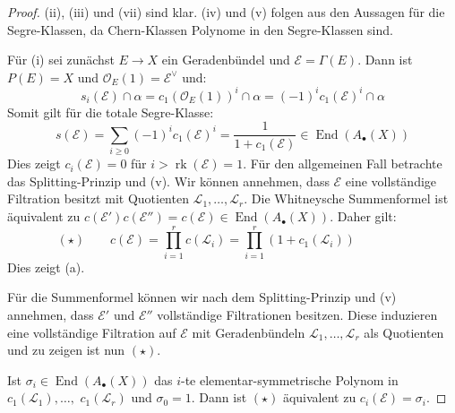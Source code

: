 \documentclass[10pt,a4paper]{article}
\begin{document}
\begin{proof}
(ii), (iii) und (vii) sind klar. (iv) und (v) folgen aus den Aussagen für die Segre-Klassen, da Chern-Klassen Polynome in den Segre-Klassen sind.

Für (i) sei zunächst $E\to X$ ein Geradenbündel und $\mathcal{E} = \Gamma(E)$. Dann ist $P(E)=X$ und $\mathcal{O}_E(1)=\mathcal{E}^\vee$ und:
\[ s_i(\mathcal{E})\cap\alpha = c_1(\mathcal{O}_E(1))^i\cap\alpha = (-1)^ic_1(\mathcal{E})^i\cap\alpha \]
Somit gilt für die totale Segre-Klasse:
\[ s(\mathcal{E}) = \sum_{i\geq 0}(-1)^ic_1(\mathcal{E})^i = \frac{1}{1+c_1(\mathcal{E})}\in\operatorname{End}(A_\bullet(X)) \]
Dies zeigt $c_i(\mathcal{E}) = 0$ für $i> \operatorname{rk}(\mathcal{E}) = 1$. Für den allgemeinen Fall betrachte das Splitting-Prinzip und (v). Wir können annehmen, dass $\mathcal{E}$ eine vollständige Filtration besitzt mit Quotienten $\mathcal{L}_1,\ldots,\mathcal{L}_r$. Die Whitneysche Summenformel ist äquivalent zu $c(\mathcal{E}')c(\mathcal{E}'') = c(\mathcal{E})\in\operatorname{End}(A_\bullet(X))$. Daher gilt:
\[ (\star) \qquad c(\mathcal{E}) = \prod_{i=1}^r c(\mathcal{L}_i) = \prod_{i=1}^r(1+c_1(\mathcal{L}_i)) \phantom{\qquad(\star)} \]
Dies zeigt (a).

Für die Summenformel können wir nach dem Splitting-Prinzip und (v) annehmen, dass $\mathcal{E}'$ und $\mathcal{E}''$ vollständige Filtrationen besitzen. Diese induzieren eine vollständige Filtration auf $\mathcal{E}$ mit Geradenbündeln $\mathcal{L}_1,\ldots,\mathcal{L}_r$ als Quotienten und zu zeigen ist nun $(\star)$.

Ist $\sigma_i\in\operatorname{End}(A_\bullet(X))$ das $i$-te elementar-symmetrische Polynom in $c_1(\mathcal{L}_1),\ldots,$ $c_1(\mathcal{L}_r)$ und $\sigma_0 =1$. Dann ist $(\star)$ äquivalent zu $c_i(\mathcal{E}) = \sigma_i$. 


\end{proof}
\end{document}
